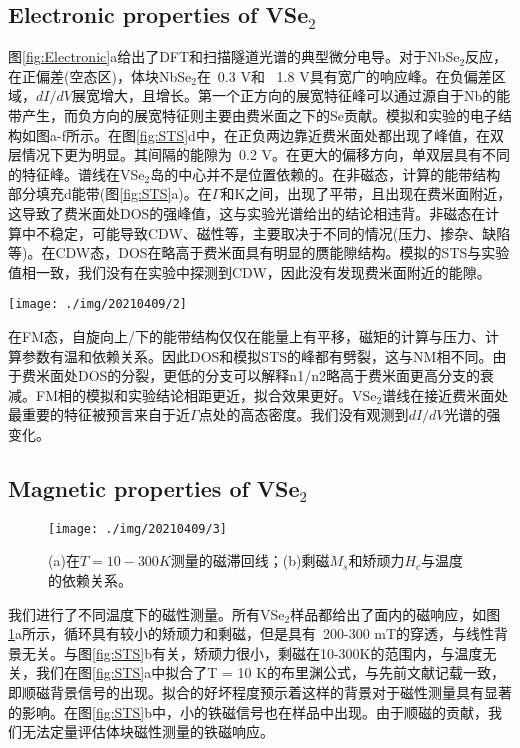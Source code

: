 \documentclass[reprint, aps, prb, showkeys]{revtex4-2}
\begin{document}
\subsection{Electronic properties of VSe$_2$}
图\ref{fig:Electronic}a给出了DFT和扫描隧道光谱的典型微分电导。对于NbSe$_2$反应，在正偏差(空态区)，体块NbSe$_2$在~0.3 V和~ 1.8 V具有宽广的响应峰。在负偏差区域，$dI/dV$展宽增大，且增长。第一个正方向的展宽特征峰可以通过源自于Nb的能带产生，而负方向的展宽特征则主要由费米面之下的Se贡献。模拟和实验的电子结构如图a-f所示。在图\ref{fig:STS}d中，在正负两边靠近费米面处都出现了峰值，在双层情况下更为明显。其间隔的能隙为~0.2 V。在更大的偏移方向，单双层具有不同的特征峰。谱线在VSe$_2$岛的中心并不是位置依赖的。在非磁态，计算的能带结构部分填充d能带(图\ref{fig:STS}a)。在$\Gamma$和K之间，出现了平带，且出现在费米面附近，这导致了费米面处DOS的强峰值，这与实验光谱给出的结论相违背。非磁态在计算中不稳定，可能导致CDW、磁性等，主要取决于不同的情况(压力、掺杂、缺陷等)。在CDW态，DOS在略高于费米面具有明显的赝能隙结构。模拟的STS与实验值相一致，我们没有在实验中探测到CDW，因此没有发现费米面附近的能隙。
\begin{figure*}[t]
    \texttt{[image: ./img/20210409/2]}
    \caption{\label{fig:STS} 
    (a)非磁性态VSe$_2$能带的计算值；(b), (c)投影DOS和模拟$dI/dV$谱；(d)单/双层VSe$_2$的典型长程实验$dI/dV$谱；(e)计算的投影DOS；(f)铁磁基态的DOS。
    }
\end{figure*}

在FM态，自旋向上/下的能带结构仅仅在能量上有平移，磁矩的计算与压力、计算参数有温和依赖关系。因此DOS和模拟STS的峰都有劈裂，这与NM相不同。由于费米面处DOS的分裂，更低的分支可以解释n1/n2略高于费米面更高分支的衰减。FM相的模拟和实验结论相距更近，拟合效果更好。VSe$_2$谱线在接近费米面处最重要的特征被预言来自于近$\Gamma$点处的高态密度。我们没有观测到$dI/dV$光谱的强变化。

\subsection{Magnetic properties of VSe$_2$}
\begin{figure}[t]
    \texttt{[image: ./img/20210409/3]}
    \caption{\label{fig:Magnetic} 
    (a)在$T = 10 - 300K$测量的磁滞回线；(b)剩磁$M_s$和矫顽力$H_c$与温度的依赖关系。
    }
\end{figure}
我们进行了不同温度下的磁性测量。所有VSe$_2$样品都给出了面内的磁响应，如图\ref{fig:Magnetic}a所示，循环具有较小的矫顽力和剩磁，但是具有~200-300 mT的穿透，与线性背景无关。与图\ref{fig:STS}b有关，矫顽力很小，剩磁在10-300K的范围内，与温度无关，我们在图\ref{fig:STS}a中拟合了T = 10 K的布里渊公式，与先前文献记载一致，即顺磁背景信号的出现。拟合的好坏程度预示着这样的背景对于磁性测量具有显著的影响。在图\ref{fig:STS}b中，小的铁磁信号也在样品中出现。由于顺磁的贡献，我们无法定量评估体块磁性测量的铁磁响应。
\end{document}
